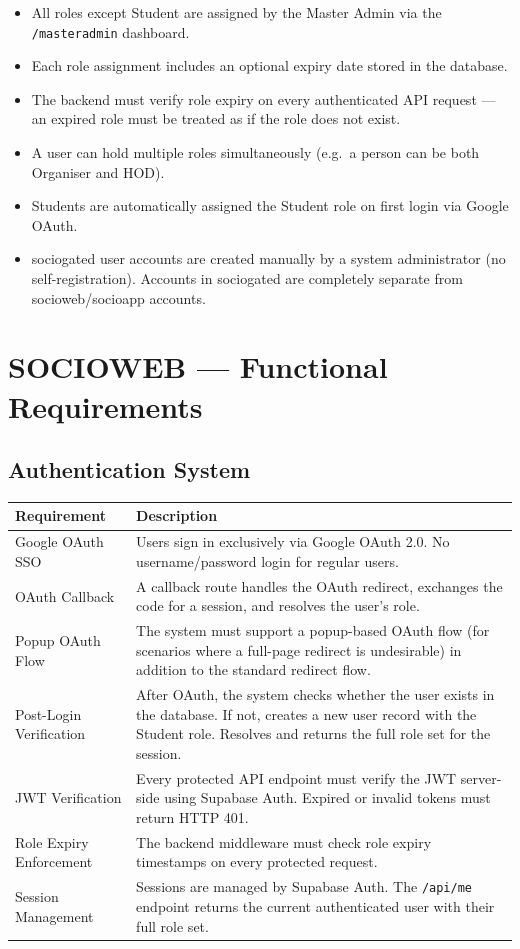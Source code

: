 \documentclass[12pt,a4paper]{article}
\begin{document}
\begin{itemize}[leftmargin=*]
    \item All roles except Student are assigned by the Master Admin via the \texttt{/masteradmin} dashboard.
    \item Each role assignment includes an optional expiry date stored in the database.
    \item The backend must verify role expiry on every authenticated API request — an expired role must be treated as if the role does not exist.
    \item A user can hold multiple roles simultaneously (e.g.\ a person can be both Organiser and HOD).
    \item Students are automatically assigned the Student role on first login via Google OAuth.
    \item sociogated user accounts are created manually by a system administrator (no self-registration). Accounts in sociogated are completely separate from socioweb/socioapp accounts.
\end{itemize}

\newpage
\section{SOCIOWEB — Functional Requirements}

\subsection{Authentication System}

\begin{tabularx}{\textwidth}{L{4cm} X}
\toprule
{}
\textbf{Requirement} & \textbf{Description} \\
\midrule
Google OAuth SSO & Users sign in exclusively via Google OAuth 2.0. No username/password login for regular users. \\
OAuth Callback & A callback route handles the OAuth redirect, exchanges the code for a session, and resolves the user's role. \\
Popup OAuth Flow & The system must support a popup-based OAuth flow (for scenarios where a full-page redirect is undesirable) in addition to the standard redirect flow. \\
Post-Login Verification & After OAuth, the system checks whether the user exists in the database. If not, creates a new user record with the Student role. Resolves and returns the full role set for the session. \\
JWT Verification & Every protected API endpoint must verify the JWT server-side using Supabase Auth. Expired or invalid tokens must return HTTP 401. \\
Role Expiry Enforcement & The backend middleware must check role expiry timestamps on every protected request. \\
Session Management & Sessions are managed by Supabase Auth. The \texttt{/api/me} endpoint returns the current authenticated user with their full role set. \\
\bottomrule
\end{tabularx}
\end{document}
